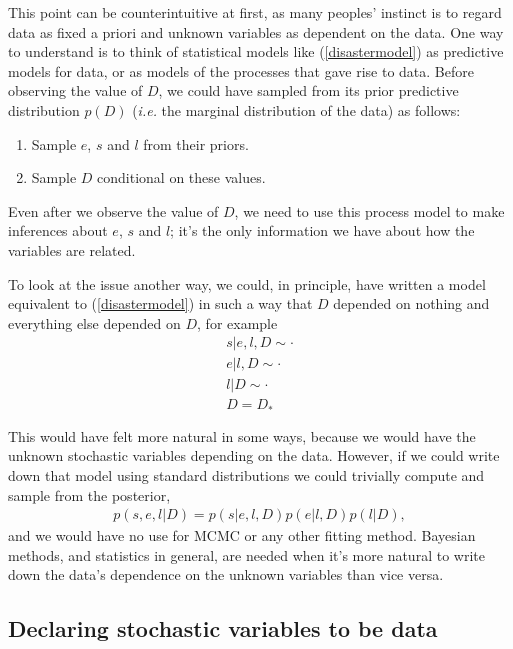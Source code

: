 This point can be counterintuitive at first, as many peoples' instinct is to regard data as fixed a priori and unknown variables as dependent on the data. One way to understand is to think of statistical models like (\ref{disastermodel}) as predictive models for data, or as models of the processes that gave rise to data. Before observing the value of $D$, we could have sampled from its prior predictive distribution $p(D)$ (\emph{i.e.} the marginal distribution of the data) as follows:
\begin{enumerate}
    \item Sample $e$, $s$ and $l$ from their priors.
    \item Sample $D$ conditional on these values.
\end{enumerate}
Even after we observe the value of $D$, we need to use this process model to make inferences about $e$, $s$ and $l$; it's the only information we have about how the variables are related.

\medskip
To look at the issue another way, we could, in principle, have written a model equivalent to (\ref{disastermodel}) in such a way that $D$ depended on nothing and everything else depended on $D$, for example
\begin{eqnarray*}
    s|e,l,D\sim\cdot\\
    e|l,D\sim\cdot\\
    l|D\sim\cdot\\
    D=D_*
\end{eqnarray*}

This would have felt more natural in some ways, because we would have the unknown stochastic variables depending on the data. However, if we could write down that model using standard distributions we could trivially compute and sample from the posterior,
\begin{eqnarray*}
    p(s,e,l|D) = p(s|e, l, D) p(e|l, D) p(l|D),
\end{eqnarray*}
and we would have no use for MCMC or any other fitting method. Bayesian methods, and statistics in general, are needed when it's more natural to write down the data's dependence on the unknown variables than vice versa.


\subsection{Declaring stochastic variables to be data}

